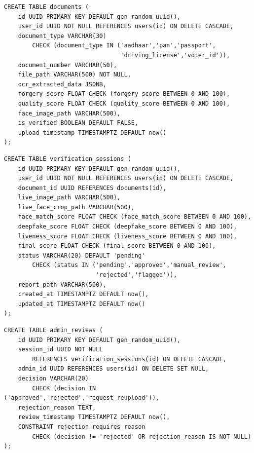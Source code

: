 \begin{lstlisting}[style=sqlstyle, caption=Documents Table DDL]
CREATE TABLE documents (
    id UUID PRIMARY KEY DEFAULT gen_random_uuid(),
    user_id UUID NOT NULL REFERENCES users(id) ON DELETE CASCADE,
    document_type VARCHAR(30)
        CHECK (document_type IN ('aadhaar','pan','passport',
                                 'driving_license','voter_id')),
    document_number VARCHAR(50),
    file_path VARCHAR(500) NOT NULL,
    ocr_extracted_data JSONB,
    forgery_score FLOAT CHECK (forgery_score BETWEEN 0 AND 100),
    quality_score FLOAT CHECK (quality_score BETWEEN 0 AND 100),
    face_image_path VARCHAR(500),
    is_verified BOOLEAN DEFAULT FALSE,
    upload_timestamp TIMESTAMPTZ DEFAULT now()
);
\end{lstlisting}

\begin{lstlisting}[style=sqlstyle, caption=Verification Sessions Table DDL]
CREATE TABLE verification_sessions (
    id UUID PRIMARY KEY DEFAULT gen_random_uuid(),
    user_id UUID NOT NULL REFERENCES users(id) ON DELETE CASCADE,
    document_id UUID REFERENCES documents(id),
    live_image_path VARCHAR(500),
    live_face_crop_path VARCHAR(500),
    face_match_score FLOAT CHECK (face_match_score BETWEEN 0 AND 100),
    deepfake_score FLOAT CHECK (deepfake_score BETWEEN 0 AND 100),
    liveness_score FLOAT CHECK (liveness_score BETWEEN 0 AND 100),
    final_score FLOAT CHECK (final_score BETWEEN 0 AND 100),
    status VARCHAR(20) DEFAULT 'pending'
        CHECK (status IN ('pending','approved','manual_review',
                          'rejected','flagged')),
    report_path VARCHAR(500),
    created_at TIMESTAMPTZ DEFAULT now(),
    updated_at TIMESTAMPTZ DEFAULT now()
);
\end{lstlisting}

\begin{lstlisting}[style=sqlstyle, caption=Admin Reviews Table DDL]
CREATE TABLE admin_reviews (
    id UUID PRIMARY KEY DEFAULT gen_random_uuid(),
    session_id UUID NOT NULL
        REFERENCES verification_sessions(id) ON DELETE CASCADE,
    admin_id UUID REFERENCES users(id) ON DELETE SET NULL,
    decision VARCHAR(20)
        CHECK (decision IN ('approved','rejected','request_reupload')),
    rejection_reason TEXT,
    review_timestamp TIMESTAMPTZ DEFAULT now(),
    CONSTRAINT rejection_requires_reason
        CHECK (decision != 'rejected' OR rejection_reason IS NOT NULL)
);
\end{lstlisting}

